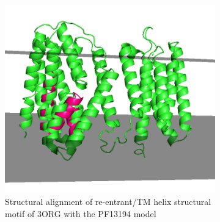 \begin{figure}[htb]
    \centering %
\begin{subfigure}{0.3\textwidth}
  \includegraphics[width=\linewidth]{Pfam/13194.png}
  \caption{Structural alignment of re-entrant/TM helix structural motif of 3ORG with the PF13194 model}
  \label{fig:13194}
\end{subfigure}\hfil %
\begin{subfigure}{0.3\textwidth}

\end{subfigure}
\end{figure}
